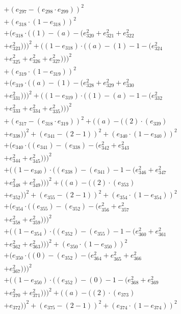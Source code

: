 \documentclass[10pt, a4paper]{article}
\begin{document}
\begin{small}
\begin{align*}
& + (e_{297} - (e_{298}  \cdot  e_{299}))^{2} \\
& + (e_{318}  \cdot  (1 - e_{318}))^{2} \\
& + (e_{318}  \cdot  ((1) - (a) - (e_{320}^{2} + e_{321}^{2} + e_{322}^{2} \\
& + e_{323}^{2})))^{2} + ((1 - e_{318})  \cdot  ((a) - (1) - 1 - (e_{324}^{2} \\
& + e_{325}^{2} + e_{326}^{2} + e_{327}^{2})))^{2} \\
& + (e_{319}  \cdot  (1 - e_{319}))^{2} \\
& + (e_{319}  \cdot  ((a) - (1) - (e_{328}^{2} + e_{329}^{2} + e_{330}^{2} \\
& + e_{331}^{2})))^{2} + ((1 - e_{319})  \cdot  ((1) - (a) - 1 - (e_{332}^{2} \\
& + e_{333}^{2} + e_{334}^{2} + e_{335}^{2})))^{2} \\
& + (e_{317} - (e_{318}  \cdot  e_{319}))^{2} + ((a) - ((2)  \cdot  (e_{339}) \\
& + e_{338}))^{2} + (e_{341} - (2 - 1))^{2} + (e_{340}  \cdot  (1 - e_{340}))^{2} \\
& + (e_{340}  \cdot  ((e_{341}) - (e_{338}) - (e_{342}^{2} + e_{343}^{2} \\
& + e_{344}^{2} + e_{345}^{2})))^{2} \\
& + ((1 - e_{340})  \cdot  ((e_{338}) - (e_{341}) - 1 - (e_{346}^{2} + e_{347}^{2} \\
& + e_{348}^{2} + e_{349}^{2})))^{2} + ((a) - ((2)  \cdot  (e_{353}) \\
& + e_{352}))^{2} + (e_{355} - (2 - 1))^{2} + (e_{354}  \cdot  (1 - e_{354}))^{2} \\
& + (e_{354}  \cdot  ((e_{355}) - (e_{352}) - (e_{356}^{2} + e_{357}^{2} \\
& + e_{358}^{2} + e_{359}^{2})))^{2} \\
& + ((1 - e_{354})  \cdot  ((e_{352}) - (e_{355}) - 1 - (e_{360}^{2} + e_{361}^{2} \\
& + e_{362}^{2} + e_{363}^{2})))^{2} + (e_{350}  \cdot  (1 - e_{350}))^{2} \\
& + (e_{350}  \cdot  ((0) - (e_{352}) - (e_{364}^{2} + e_{365}^{2} + e_{366}^{2} \\
& + e_{367}^{2})))^{2} \\
& + ((1 - e_{350})  \cdot  ((e_{352}) - (0) - 1 - (e_{368}^{2} + e_{369}^{2} \\
& + e_{370}^{2} + e_{371}^{2})))^{2} + ((a) - ((2)  \cdot  (e_{373}) \\
& + e_{372}))^{2} + (e_{375} - (2 - 1))^{2} + (e_{374}  \cdot  (1 - e_{374}))^{2} \\

\end{align*}
\end{small}
\end{document}
